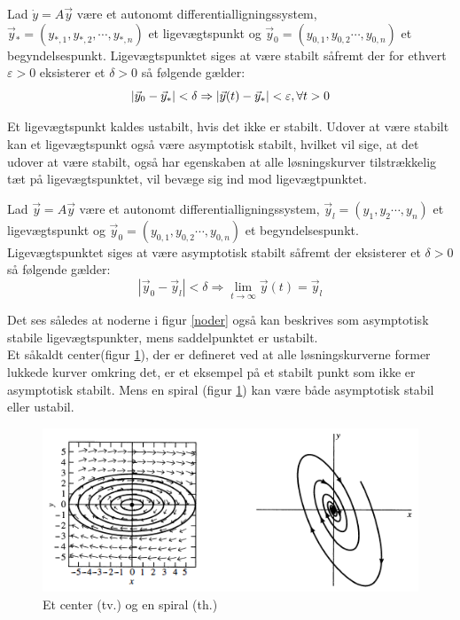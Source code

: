 \begin{definition}
Lad 
$\dot y = A \vec y$
være et autonomt differentialligningssystem, $\vec y_*=(y_{*,1},y_{*,2}, \cdots ,y_{*,n})$ et ligevægtspunkt og $\vec y_0=(y_{0,1},y_{0,2} \cdots ,y_{0,n})$ et begyndelsespunkt. Ligevægtspunktet siges at være stabilt såfremt der for ethvert $\varepsilon >0$ eksisterer et $\delta >0$ så følgende gælder:
$$|\vec y_0 - \vec y_*|< \delta \Rightarrow |\vec y(t) - \vec y_*| < \varepsilon, \\ \forall t > 0$$
\end{definition}
Et ligevægtspunkt kaldes ustabilt, hvis det ikke er stabilt.
Udover at være stabilt kan et ligevægtspunkt også være asymptotisk stabilt, hvilket vil sige, at det udover at være stabilt, også har egenskaben at alle løsningskurver tilstrækkelig tæt på ligevægtspunktet, vil bevæge sig ind mod ligevægtpunktet.

\begin{definition}
Lad 
$\vec y = A \vec y$
være et autonomt differentialligningssystem, $\vec y_l=(y_1,y_2 \cdots ,y_n)$ et ligevægtspunkt og $\vec y_0=(y_{0,1},y_{0,2} \cdots ,y_{0,n})$ et begyndelsespunkt. Ligevægtspunktet siges at være asymptotisk stabilt såfremt der eksisterer et $\delta >0$ så følgende gælder:
$$|\vec y_0 - \vec y_l|< \delta \Rightarrow \lim_{t\to\infty} \vec y(t)= \vec y_l$$
\end{definition}
Det ses således at noderne i figur \ref{noder} også kan beskrives som asymptotisk stabile ligevægtspunkter, mens saddelpunktet er ustabilt. \\
Et såkaldt center(figur \ref{center}), der er defineret ved at alle løsningskurverne former lukkede kurver omkring det, er et eksempel på et stabilt punkt som ikke er asymptotisk stabilt. Mens en spiral (figur \ref{center}) kan være både asymptotisk stabil eller ustabil.

\begin{figure} [H]
    \centering
    \includegraphics{Images/center.png}
    \caption{Et center (tv.) og en spiral (th.) }
    \label{center}
\end{figure}